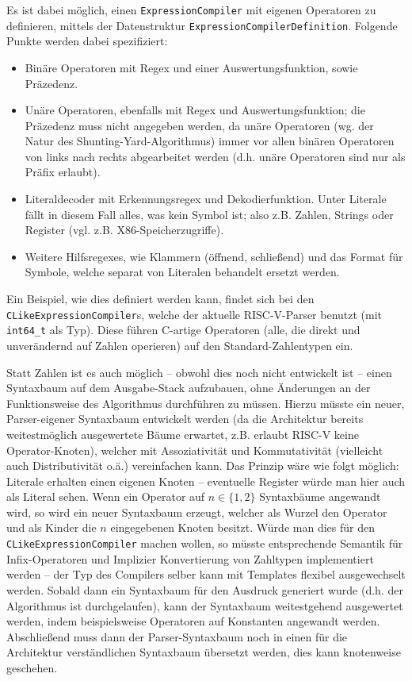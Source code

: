 Es ist dabei möglich, einen \texttt{ExpressionCompiler} mit eigenen Operatoren
zu definieren, mittels der Datenstruktur \texttt{ExpressionCompilerDefinition}.
Folgende Punkte werden dabei spezifiziert:

\begin{itemize}
  \item Binäre Operatoren mit Regex und einer Auswertungsfunktion, sowie
  Präzedenz.

  \item Unäre Operatoren, ebenfalls mit Regex und Auswertungsfunktion; die
  Präzedenz muss nicht angegeben werden, da unäre Operatoren (wg. der Natur des
  Shunting-Yard-Algorithmus) immer vor allen binären Operatoren von links nach
  rechts abgearbeitet werden (d.h. unäre Operatoren sind nur als Präfix
  erlaubt).

  \item Literaldecoder mit Erkennungsregex und Dekodierfunktion. Unter Literale
  fällt in diesem Fall alles, was kein Symbol ist; also z.B. Zahlen, Strings
  oder Register (vgl. z.B. X86-Speicherzugriffe).

  \item Weitere Hilfsregexes, wie Klammern (öffnend, schließend) und das Format
  für Symbole, welche separat von Literalen behandelt ersetzt werden.

\end{itemize}

Ein Beispiel, wie dies definiert werden kann, findet sich bei den
\texttt{CLikeExpressionCompiler}s, welche der aktuelle RISC-V-Parser benutzt
(mit \texttt{int64\_t} als Typ). Diese führen C-artige Operatoren (alle, die
direkt und unverändernd auf Zahlen operieren) auf den Standard-Zahlentypen ein.

Statt Zahlen ist es auch möglich – obwohl dies noch nicht entwickelt ist – einen
Syntaxbaum auf dem Ausgabe-Stack aufzubauen, ohne Änderungen an der
Funktionsweise des Algorithmus durchführen zu müssen. Hierzu müsste ein neuer,
Parser-eigener Syntaxbaum entwickelt werden (da die Architektur bereits
weitestmöglich ausgewertete Bäume erwartet, z.B. erlaubt RISC-V keine
Operator-Knoten), welcher mit Assoziativität und Kommutativität (vielleicht auch
Distributivität o.ä.) vereinfachen kann. Das Prinzip wäre wie folgt möglich:
Literale erhalten einen eigenen Knoten – eventuelle Register würde man hier auch
als Literal sehen. Wenn ein Operator auf $n\in\{1,2\}$ Syntaxbäume angewandt
wird, so wird ein neuer Syntaxbaum erzeugt, welcher als Wurzel den Operator und
als Kinder die $n$ eingegebenen Knoten besitzt. Würde man dies für den
\texttt{CLikeExpressionCompiler} machen wollen, so müsste entsprechende Semantik
für Infix-Operatoren und Implizier Konvertierung von Zahltypen implementiert
werden – der Typ des Compilers selber kann mit Templates flexibel ausgewechselt
werden. Sobald dann ein Syntaxbaum für den Ausdruck generiert wurde (d.h. der
Algorithmus ist durchgelaufen), kann der Syntaxbaum weitestgehend ausgewertet
werden, indem beispielsweise Operatoren auf Konstanten angewandt werden.
Abschließend muss dann der Parser-Syntaxbaum noch in einen für die Architektur
verständlichen Syntaxbaum übersetzt werden, dies kann knotenweise geschehen.

